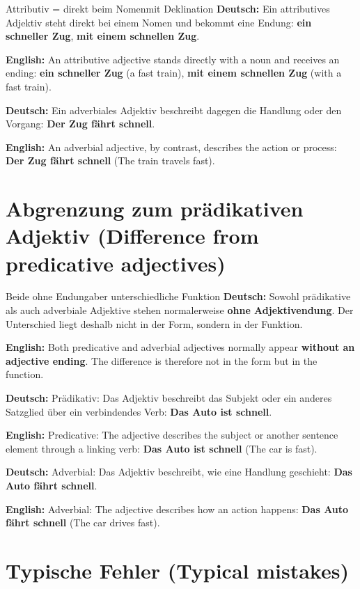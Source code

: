 \documentclass[a4paper,11pt]{article}
\newcommand{\GermanText}[1]{\textbf{Deutsch: }#1\par}
\newcommand{\EnglishText}[1]{{\small\color{SoftGray}\textbf{English: }#1\par}}
\begin{document}
        \begin{grammarentry}{Attributiv = direkt beim Nomen}{mit Deklination}
            \GermanText{Ein attributives Adjektiv steht direkt bei einem Nomen und bekommt eine Endung: \textbf{ein schneller Zug}, \textbf{mit einem schnellen Zug}.}
            \EnglishText{An attributive adjective stands directly with a noun and receives an ending: \textbf{ein schneller Zug} (a fast train), \textbf{mit einem schnellen Zug} (with a fast train).}

            \GermanText{Ein adverbiales Adjektiv beschreibt dagegen die Handlung oder den Vorgang: \textbf{Der Zug fährt schnell}.}
            \EnglishText{An adverbial adjective, by contrast, describes the action or process: \textbf{Der Zug fährt schnell} (The train travels fast).}
        \end{grammarentry}

    \section{Abgrenzung zum prädikativen Adjektiv \textnormal{(Difference from predicative adjectives)}}

        \begin{grammarentry}{Beide ohne Endung}{aber unterschiedliche Funktion}
            \GermanText{Sowohl prädikative als auch adverbiale Adjektive stehen normalerweise \textbf{ohne Adjektivendung}. Der Unterschied liegt deshalb nicht in der Form, sondern in der Funktion.}
            \EnglishText{Both predicative and adverbial adjectives normally appear \textbf{without an adjective ending}. The difference is therefore not in the form but in the function.}

            \GermanText{Prädikativ: Das Adjektiv beschreibt das Subjekt oder ein anderes Satzglied über ein verbindendes Verb: \textbf{Das Auto ist schnell}.}
            \EnglishText{Predicative: The adjective describes the subject or another sentence element through a linking verb: \textbf{Das Auto ist schnell} (The car is fast).}

            \GermanText{Adverbial: Das Adjektiv beschreibt, wie eine Handlung geschieht: \textbf{Das Auto fährt schnell}.}
            \EnglishText{Adverbial: The adjective describes how an action happens: \textbf{Das Auto fährt schnell} (The car drives fast).}
        \end{grammarentry}

    \section{Typische Fehler \textnormal{(Typical mistakes)}}
\end{document}
